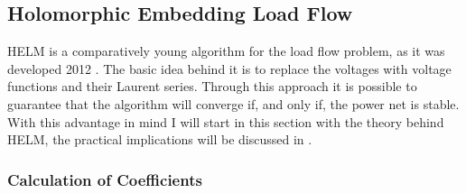 \subsection{Holomorphic Embedding Load Flow}
\label{sec:helm}

HELM is a comparatively young algorithm for the load flow problem, as it was developed 2012 \citep{helmIEEE}. The basic idea behind it is to replace the voltages with voltage functions and their Laurent series. Through this approach it is possible to guarantee that the algorithm will converge if, and only if, the power net is stable. With this advantage in mind I will start in this section with the theory behind HELM, the practical implications will be discussed in .

\subsubsection{Calculation of Coefficients}

